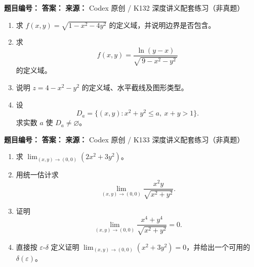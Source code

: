 
\begin{problemBox}
\begin{problemMeta}
\textbf{题目编号：}  \quad
\textbf{答案：}  \quad
\textbf{来源：} Codex 原创 / K132 深度讲义配套练习（非真题）
\end{problemMeta}
\begin{enumerate}
\item[\textbf{A}] 求 \(f(x,y)=\sqrt{1-x^2-4y^2}\) 的定义域，并说明边界是否包含。
\item[\textbf{B}] 求
\[
f(x,y)=\frac{\ln(y-x)}{\sqrt{\,9-x^2-y^2\,}}
\]
的定义域。
\item[\textbf{C}] 说明 \(z=4-x^2-y^2\) 的定义域、水平截线及图形类型。
\item[\textbf{M}] 设
\[
D_a=\{(x,y):x^2+y^2\le a,\ x+y>1\}.
\]
求实数 \(a\) 使 \(D_a\ne\varnothing\)。
\end{enumerate}
\end{problemBox}

\begin{problemBox}
\begin{problemMeta}
\textbf{题目编号：}  \quad
\textbf{答案：}  \quad
\textbf{来源：} Codex 原创 / K133 深度讲义配套练习（非真题）
\end{problemMeta}
\begin{enumerate}
\item[\textbf{A}] 求 \(\displaystyle\lim_{(x,y)\to(0,0)}(2x^2+3y^2)\)。
\item[\textbf{B}] 用统一估计求
\[
\lim_{(x,y)\to(0,0)}\frac{x^2y}{\sqrt{x^2+y^2}}.
\]
\item[\textbf{C}] 证明
\[
\lim_{(x,y)\to(0,0)}
\frac{x^4+y^4}{\sqrt{x^2+y^2}}=0.
\]
\item[\textbf{M}] 直接按 \(\varepsilon\)-\(\delta\) 定义证明
\(\lim_{(x,y)\to(0,0)}(x^2+3y^2)=0\)，并给出一个可用的
\(\delta(\varepsilon)\)。
\end{enumerate}
\end{problemBox}

